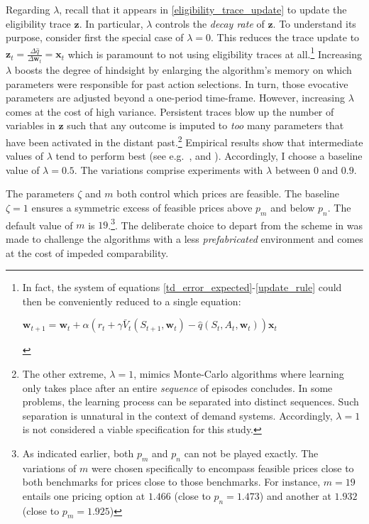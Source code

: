 {Regarding $\lambda$, recall that it appears in \autoref{eligibility_trace_update} to update the eligibility trace $\boldsymbol{z}$. In particular, $\lambda$ controls the \emph{decay rate} of $\boldsymbol{z}$. To understand its purpose, consider first the special case of $\lambda = 0$. This reduces the trace update to $\boldsymbol{z}_t = \frac{\Delta \hat{q}}{\Delta \boldsymbol{w}_t} = \boldsymbol{x}_t$ which is paramount to not using eligibility traces at all.\footnote{In fact, the system of equations \ref{td_error_expected}-\ref{update_rule} could then be conveniently reduced to a single equation:
	\begin{center}
		$\boldsymbol{w}_{t+1} = \boldsymbol{w}_t + \alpha (r_t + \gamma \bar{V}_t(S_{t+1}, \boldsymbol{w}_t) - \hat{q}(S_t, A_t, \boldsymbol{w}_t)) \boldsymbol{x}_t$
	\end{center}
} Increasing $\lambda$ boosts the degree of hindsight by enlarging the algorithm's memory on which parameters were responsible for past action selections. In turn, those evocative parameters are adjusted beyond a one-period time-frame. However, increasing $\lambda$ comes at the cost of high variance. Persistent traces blow up the number of variables in $\boldsymbol{z}$ such that any outcome is imputed to \emph{too} many parameters that have been activated in the distant past.\footnote{The other extreme, $\lambda = 1$, mimics Monte-Carlo algorithms where learning only takes place after an entire \emph{sequence} of episodes concludes. In some problems, the learning process can be separated into distinct sequences. Such separation is unnatural in the context of demand systems. Accordingly, $\lambda = 1$ is not considered a viable specification for this study.} Empirical results show that intermediate values of $\lambda$ tend to perform best (see e.g.\ \textcite{sutton_1988}, \textcite{rummery_niranjan_1994} and \textcite{sutton_reinforcement_2018}). Accordingly, I choose a baseline value of $\lambda = 0.5$. The variations comprise experiments with $\lambda$ between $0$ and $0.9$.

The parameters $\zeta$ and $m$ both control which prices are feasible. The baseline $\zeta = 1$ ensures a symmetric excess of feasible prices above $p_m$ and below $p_n$. The default value of $m$ is $19$.\footnote{As indicated earlier, both $p_m$ and $p_n$ can not be played exactly. The variations of $m$ were chosen specifically to encompass feasible prices close to both benchmarks for prices close to those benchmarks. For instance, $m = 19$ entails one pricing option at $1.466$ (close to $p_n = 1.473$) and another at $1.932$ (close to $p_m = 1.925$)}. The deliberate choice to depart from the scheme in \textcite{calvano_algorithmic_2018} was made to challenge the algorithms with a less \emph{prefabricated} environment and comes at the cost of impeded comparability.



}
